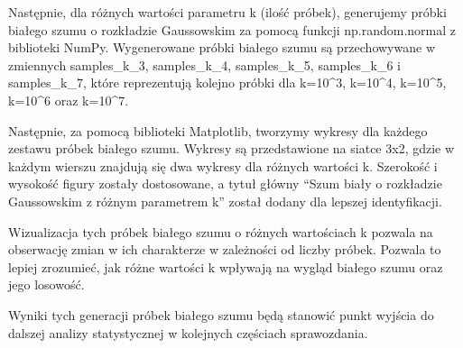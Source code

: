 \documentclass[11pt]{article}
\begin{document}
Następnie, dla różnych wartości parametru k (ilość próbek), generujemy
próbki białego szumu o rozkładzie Gaussowskim za pomocą funkcji
np.random.normal z biblioteki NumPy. Wygenerowane próbki białego szumu
są przechowywane w zmiennych samples\_k\_3, samples\_k\_4,
samples\_k\_5, samples\_k\_6 i samples\_k\_7, które reprezentują kolejno
próbki dla k=10\^{}3, k=10\^{}4, k=10\^{}5, k=10\^{}6 oraz k=10\^{}7.

Następnie, za pomocą biblioteki Matplotlib, tworzymy wykresy dla każdego
zestawu próbek białego szumu. Wykresy są przedstawione na siatce 3x2,
gdzie w każdym wierszu znajdują się dwa wykresy dla różnych wartości k.
Szerokość i wysokość figury zostały dostosowane, a tytuł główny ``Szum
biały o rozkładzie Gaussowskim z różnym parametrem k'' został dodany dla
lepszej identyfikacji.

Wizualizacja tych próbek białego szumu o różnych wartościach k pozwala
na obserwację zmian w ich charakterze w zależności od liczby próbek.
Pozwala to lepiej zrozumieć, jak różne wartości k wpływają na wygląd
białego szumu oraz jego losowość.

Wyniki tych generacji próbek białego szumu będą stanowić punkt wyjścia
do dalszej analizy statystycznej w kolejnych częściach sprawozdania.
\end{document}
